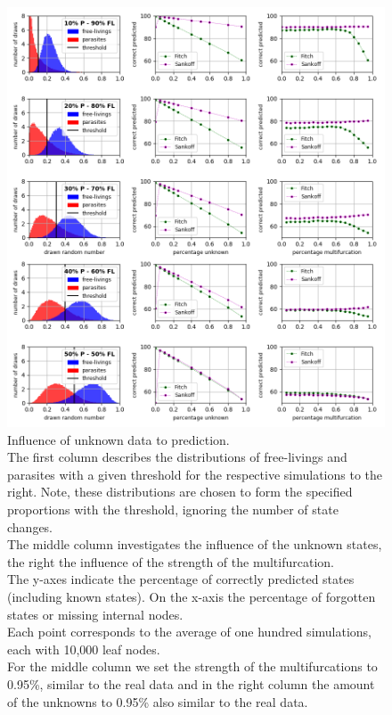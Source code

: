     \begin{figure}[h!]
      \centering
      \includegraphics[trim = 0mm 0mm 0mm 150mm, clip, width=\textwidth]{Figures/simulation_evaluation_1.png}
      \caption{Influence of unknown data to prediction. \\
        The first column describes the distributions of free-livings and parasites with a given 
          threshold for the respective simulations to the right. Note, these distributions are chosen 
          to form the specified proportions with the threshold, ignoring the number of state changes. \\
        The middle column investigates the influence of the unknown states, the right the influence of
          the strength of the multifurcation. \\
        The y-axes indicate the percentage of correctly predicted states (including known states). On 
          the x-axis the percentage of forgotten states or missing internal nodes. \\
        Each point corresponds to the average of one hundred simulations, each with 10,000 leaf nodes. \\
        For the middle column we set the strength of the multifurcations to 0.95\%, similar to the 
          real data and in the right column the amount of the unknowns to 0.95\% also similar to the 
          real data.}
      \label{fig:influence of unknown data}
    \end{figure}

